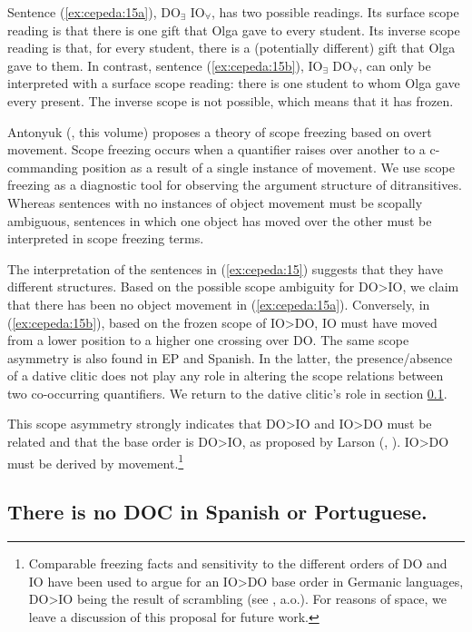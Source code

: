 \documentclass[output=paper,colorlinks,citecolor=brown,nonflat]{./langscibook}
\begin{document}
Sentence (\ref{ex:cepeda:15a}), DO$_∃$ IO$_∀$, has two possible readings. Its surface scope reading is that there is one gift that Olga gave to every student. Its inverse scope reading is that, for every student, there is a (potentially different) gift that Olga gave to them. In contrast, sentence (\ref{ex:cepeda:15b}), IO$_∃$  DO$_∀$, can only be interpreted with a surface scope reading: there is one student to whom Olga gave every present. The inverse scope is not possible, which means that it has frozen.

Antonyuk (\citeyear{Antonyuk2015}, this volume) proposes a theory of scope freezing based on overt movement. Scope freezing occurs when a quantifier raises over another to a c-commanding position as a result of a single instance of movement. We use scope freezing as a diagnostic tool for observing the argument structure of ditransitives. Whereas sentences with no instances of object movement must be scopally ambiguous, sentences in which one object has moved over the other must be interpreted in scope freezing terms.

The interpretation of the sentences in (\ref{ex:cepeda:15}) suggests that they have different structures. Based on the possible scope ambiguity for DO>IO, we claim that there has been no object movement in (\ref{ex:cepeda:15a}). Conversely, in (\ref{ex:cepeda:15b}), based on the frozen scope of IO>DO, IO must have moved from a lower position to a higher one crossing over DO. The same scope asymmetry is also found in EP and Spanish. In the latter, the presence/absence of a dative clitic does not play any role in altering the scope relations between two co-occurring quantifiers. We return to the dative clitic’s role in section \ref{sec:cepeda:2.2}.

This scope asymmetry strongly indicates that DO>IO and IO>DO must be related and that the base order is DO>IO, as proposed by Larson (\citeyear{Larson1988}, \citeyear{Larson2014}). IO>DO must be derived by movement.\footnote{Comparable freezing facts and sensitivity to the different orders of DO and IO have been used to argue for an IO>DO base order in Germanic languages, DO>IO being the result of scrambling (see \citealt{Abraham1986, Choi1996, Bacovcin2017}, a.o.). For reasons of space, we leave a discussion of this proposal for future work.}

\subsection{There is no DOC in Spanish or Portuguese.}\label{sec:cepeda:2.2}
\end{document}

